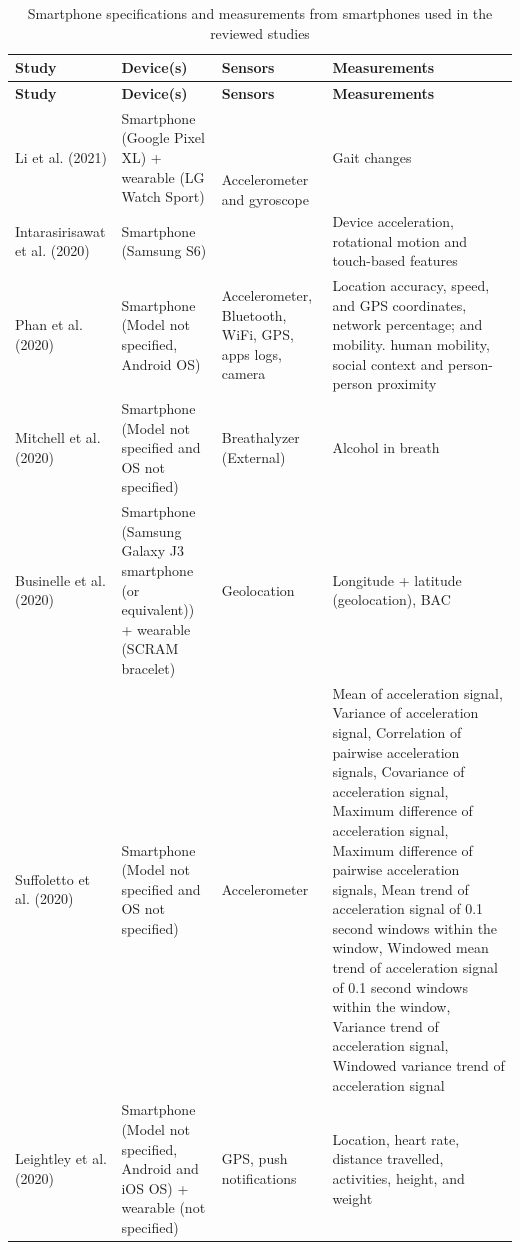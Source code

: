 \begin{longtable}[h!]{||p{} | p{} | p{}| p{}||}
\caption{Smartphone specifications  and measurements from smartphones used in the reviewed studies}
\label{devices}
\endfirsthead
\hline
\textbf{Study} & \textbf{Device(s)} & \textbf{Sensors} & \textbf{Measurements} \\
\hline
\hline
\endhead
\hline
\textbf{Study} & \textbf{Device(s)} & \textbf{Sensors} & \textbf{Measurements} \\
\hline
Li et al. (2021) \cite{Li2021} & Smartphone (Google Pixel XL) + wearable (LG Watch Sport) & \multirow{2}{=}{Accelerometer and gyroscope} & Gait changes \\ \cline{1-2} \cline{4-4}
Intarasirisawat et al. (2020) \cite{Intarasirisawat2020} & Smartphone (Samsung S6) &  & Device acceleration, rotational motion and touch-based features \\ \hline
Phan et al. (2020) \cite{Phan2020211} & Smartphone (Model not specified, Android OS) & Accelerometer, Bluetooth, WiFi, GPS, apps logs, camera & Location accuracy, speed, and GPS coordinates, network percentage; and mobility. human mobility, social context and person-person proximity \\ \hline
Mitchell et al. (2020) \cite{Mitchell2020297} & Smartphone (Model not specified and OS not specified) & Breathalyzer (External) & Alcohol in breath \\ \hline
Businelle et al. (2020) \cite{Businelle2020} & Smartphone (Samsung Galaxy J3 smartphone (or equivalent)) + wearable (SCRAM bracelet) & Geolocation & Longitude + latitude (geolocation), BAC  \\ \hline
Suffoletto et al. (2020) \cite{Suffoletto2020505} & Smartphone (Model not specified and OS not specified) & Accelerometer & Mean of acceleration signal, Variance of acceleration signal, Correlation of pairwise acceleration signals, Covariance of acceleration signal, Maximum difference of acceleration signal, Maximum difference of pairwise acceleration signals, Mean trend of acceleration signal of 0.1 second windows within the window, Windowed mean trend of acceleration signal of 0.1 second windows within the window, Variance trend of acceleration signal, Windowed variance trend of acceleration signal \\ \hline
Leightley et al. (2020) \cite{Leightley2020} & Smartphone (Model not specified, Android and iOS OS) + wearable (not specified) & GPS, push notifications & Location, heart rate, distance travelled, activities, height, and weight \\ \hline

\end{longtable}
